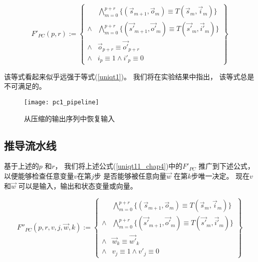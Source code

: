 \begin{equation}\label{uniqt11_chap4}
F'_{PC}(p,r):=
\left\{
\begin{array}{cc}
&\bigwedge_{m=0}^{p+r}
\{
(\vec{s}_{m+1},\vec{o}_m)\equiv T(\vec{s}_m,\vec{i}_m)
\}
\\
\wedge&\bigwedge_{m=0}^{p+r}
\{
(\vec{s'}_{m+1},\vec{o'}_m)\equiv T(\vec{s'}_m,\vec{i'}_m)
\}
\\
\wedge&\vec{o}_{p+r}\equiv \vec{o'}_{p+r} \\
\wedge& i_{p}\equiv 1 \wedge  i'_{p}\equiv 0
\end{array}
\right\}
\end{equation}


该等式看起来似乎远强于等式(\ref{uniqt1})。
我们将在实验结果中指出，
该等式总是不可满足的。

\begin{figure}[t]
\begin{center}
\texttt{[image: pc1\_pipeline]}
\end{center}
\caption{从压缩的输出序列中恢复输入}
  \label{fig_pc1_chap4}
\end{figure}

\subsection{推导流水线}\label{subsec_inferstage}

基于上述的$p$ 和$r$，
我们将上述公式(\ref{uniqt11_chap4})中的$F'_{PC}$ 推广到下述公式，
以便能够检查任意变量$v$在第$j$步
是否能够被任意向量$\vec{w}$ 在第$k$步唯一决定。
现在$v$ 和$\vec{w}$ 可以是输入，输出和状态变量或向量。

\begin{equation}\label{uniqt2}
F''_{PC}(p,r,v,j,\vec{w},k):=
\left\{
\begin{array}{cc}
&\bigwedge_{m=0}^{p+r}
\{
(\vec{s}_{m+1},\vec{o}_m)\equiv T(\vec{s}_m,\vec{i}_m)
\}
\\
\wedge&\bigwedge_{m=0}^{p+r}
\{
(\vec{s'}_{m+1},\vec{o'}_m)\equiv T(\vec{s'}_m,\vec{i'}_m)
\}
\\
\wedge&\vec{w}_{k}\equiv \vec{w'}_{k} \\
\wedge& v_{j}\equiv 1 \wedge  v'_{j}\equiv 0
\end{array}
\right\}
\end{equation}

